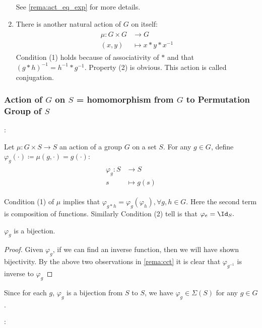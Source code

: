 \documentclass{article}
\begin{document}
\begin{enumerate}
See \cref{rema:act_eq_exp} for more details.

\item {} There is another natural action of $G$ on itself:
\begin{align*}
\begin{aligned}
\mu: G \times G & \rightarrow G \\
(x, y) & \mapsto x * y * x^{-1} 
\end{aligned}
\end{align*}
Condition (1) holds because of associativity of $*$ and that $(g * h)^{-1}=h^{-1} * g^{-1} .$ Property
(2) is obvious. This action is called conjugation.
\end{enumerate}


\subsubsection{Action of $G$ on $S$ = homomorphism from $G$ to Permutation Group of $S$}
:

Let $\mu: G \times S \rightarrow S$ an action of a group $G$ on a set $S$. For any $g \in G$, define $\varphi_{g}(\cdot)\coloneqq\mu(g,\cdot)=g(\cdot)$:
\begin{align*}
\begin{aligned}
\varphi_{g}: S & \rightarrow S \\
s & \mapsto g(s)
\end{aligned}
\end{align*}
\begin{rema}\label{rema:cct}
Condition (1) of $\mu$ implies that $\varphi_{g * h}=\varphi_{g} (\varphi_{h} ), \forall g, h \in G$. Here the second term is composition of functions. Similarly Condition (2) tell is that $\varphi_{e}=\Id_{S} .$
\end{rema} 
\begin{lema}
 $\varphi_{g}$ is a bijection.
\end{lema}
\begin{proof}
Given $\varphi_{g}$, if we can find an inverse function, then we will have shown bijectivity. By the above two observations in \cref{rema:cct} it is clear that $\varphi_{g^{-1}}$ is inverse to $\varphi_{g}$
\end{proof}
\begin{rema}
Since for each $g$, $\varphi_{g}$ is a bijection from $S$ to $S$, we have   $\varphi_{g}\in \Sigma(S)$ for any $g\in G$.
\end{rema}
:
\end{document}
